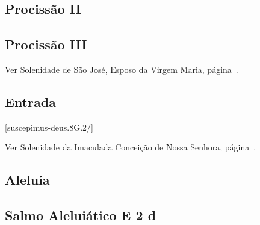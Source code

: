\AllowPageFlush

\subsection{Procissão II}\label{subsection:proprium-sanctorum/in-praesentatione-domini/ad-processionem-2}

\subsection{Procissão III}
\begin{rubrica}
  Ver Solenidade de São José, Esposo da Virgem Maria, página~\pageref{subsection:proprium-sanctorum/sancti-ioseph-sponsi-bmv/psalmus-responsorius}.
\end{rubrica}

\AllowPageFlush

\subsection{Entrada}\label{subsection:proprium-sanctorum/in-praesentatione-domini/introitus}
[suscepimus-deus.8G.2/]


\begin{rubrica}
  Ver Solenidade da Imaculada Conceição de Nossa Senhora, página~\pageref{subsection:proprium-sanctorum/in-conceptione-immaculata-bmv/psalmus-responsorius}.
\end{rubrica}

\subsection{Aleluia}\label{subsection:proprium-sanctorum/in-praesentatione-domini/alleluia}

\AllowPageFlush

\subsection[Salmo Aleluiático]{Salmo Aleluiático \textmd{E 2 d}}\label{subsection:proprium-sanctorum/in-praesentatione-domini/psalmus-alleluiaticus}

\AllowPageFlush

